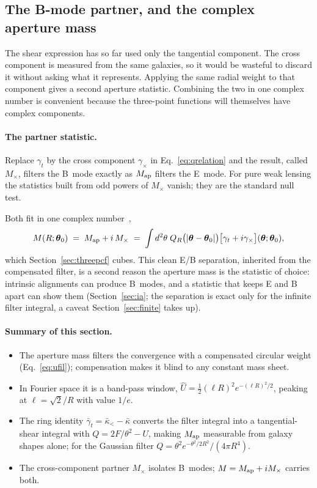 \documentclass[11pt]{article}
\newcommand{\Map}{M_{\rm ap}}
\newcommand{\Mx}{M_{\times}}
\newcommand{\Qfil}{Q_R}
\newcommand{\Uhat}{\widehat{U}}
\newcommand{\btheta}{\boldsymbol{\theta}}
\numberwithin{equation}{section}
\begin{document}
\subsection{The B-mode partner, and the complex aperture mass}
\label{sec:mperp}

The shear expression has so far used only the tangential component. The
cross component is measured from the same galaxies, so it would be
wasteful to discard it without asking what it represents. Applying the
same radial weight to that component gives a second aperture statistic.
Combining the two in one complex number is convenient because the
three-point functions will themselves have complex components.

\paragraph{The partner statistic.}
Replace $\gamma_t$ by the cross component $\gamma_\times$ in
Eq.~\eqref{eq:qrelation} and the result, called $\Mx$, filters the
B~mode exactly as $\Map$ filters the E~mode.  For pure weak lensing
the statistics built from odd powers of $\Mx$ vanish; they are the
standard null test.

Both fit in one complex number~\cite{SKL},
\begin{equation}
  M(R;\btheta_0)
  \;=\; \Map + i\,\Mx
  \;=\; \int d^2\theta\;
  \Qfil\bigl(|\btheta - \btheta_0|\bigr)
  \bigl[\gamma_t + i\gamma_\times\bigr](\btheta;\btheta_0) ,
  \label{eq:complexm}
\end{equation}
which Section~\ref{sec:threepcf} cubes.  This clean E/B separation,
inherited from the compensated filter, is a second reason the
aperture mass is the statistic of choice: intrinsic alignments can
produce B~modes, and a statistic that keeps E and B apart can show
them (Section~\ref{sec:ia}; the separation is exact only for the
infinite filter integral, a caveat Section~\ref{sec:finite} takes
up).

\paragraph{Summary of this section.}
\begin{itemize}
  \item The aperture mass filters the convergence with a compensated
    circular weight (Eq.~\eqref{eq:ufil}); compensation makes it
    blind to any constant mass sheet.
  \item In Fourier space it is a band-pass window,
    $\Uhat = \tfrac12 (\ell R)^2 e^{-(\ell R)^2/2}$, peaking at
    $\ell = \sqrt{2}/R$ with value $1/e$.
  \item The ring identity
    $\bar\gamma_t = \bar\kappa_< - \bar\kappa$ converts the filter
    integral into a tangential-shear integral with
    $Q = 2F/\theta^2 - U$, making $\Map$ measurable from galaxy
    shapes alone; for the Gaussian filter
    $Q = \theta^2 e^{-\theta^2/2R^2}/(4\pi R^4)$.
  \item The cross-component partner $\Mx$ isolates B~modes;
    $M = \Map + i\Mx$ carries both.
\end{itemize}
\end{document}
